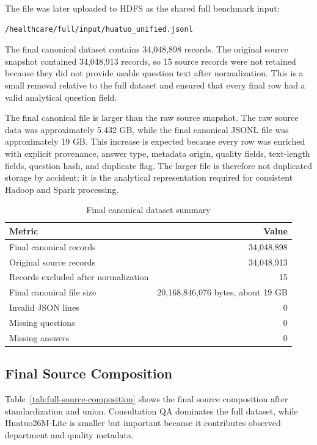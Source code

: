 \documentclass[12pt,a4paper]{article}
\begin{document}
The file was later uploaded to HDFS as the shared full benchmark input:

\begin{verbatim}
/healthcare/full/input/huatuo_unified.jsonl
\end{verbatim}

The final canonical dataset contains 34,048,898 records. The original source snapshot contained 34,048,913 records, so 15 source records were not retained because they did not provide usable question text after normalization. This is a small removal relative to the full dataset and ensured that every final row had a valid analytical question field.

The final canonical file is larger than the raw source snapshot. The raw source data was approximately 5.432 GB, while the final canonical JSONL file was approximately 19 GB. This increase is expected because every row was enriched with explicit provenance, answer type, metadata origin, quality fields, text-length fields, question hash, and duplicate flag. The larger file is therefore not duplicated storage by accident; it is the analytical representation required for consistent Hadoop and Spark processing.

\begin{table}[H]
\centering
\caption{Final canonical dataset summary}
\label{tab:full-summary}
\begin{tabular}{lr}
\toprule
Metric & Value \\
\midrule
Final canonical records & 34,048,898 \\
Original source records & 34,048,913 \\
Records excluded after normalization & 15 \\
Final canonical file size & 20,168,846,076 bytes, about 19 GB \\
Invalid JSON lines & 0 \\
Missing questions & 0 \\
Missing answers & 0 \\
\bottomrule
\end{tabular}
\end{table}

\subsection{Final Source Composition}

Table~\ref{tab:full-source-composition} shows the final source composition after standardization and union. Consultation QA dominates the full dataset, while Huatuo26M-Lite is smaller but important because it contributes observed department and quality metadata.
\end{document}
